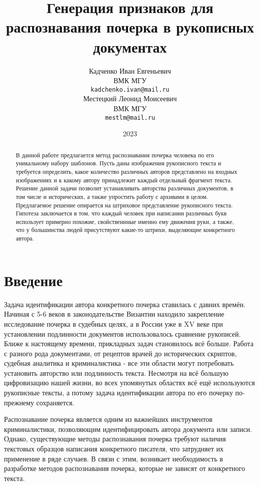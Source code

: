\documentclass{article}
\title{Генерация признаков для распознавания почерка в рукописных документах}
\author{Кадченко Иван Евгеньевич \\
	ВМК МГУ\\
	\texttt{kadchenko.ivan@mail.ru} \\
	\And
	Местецкий Леонид Моисеевич \\
	ВМК МГУ\\
	\texttt{mestlm@mail.ru} \\
}
\date{2023}
\begin{document}
\maketitle

\begin{abstract}
	В данной работе предлагается метод распознавания почерка человека по его уникальному набору шаблонов. Пусть даны изображения рукописного текста и требуется определить, какое количество различных авторов представлено на входных изображениях и к какому автору принадлежит каждый отдельный фрагмент текста. Решение данной задачи позволит устанавливать авторства различных документов, в том числе и исторических, а также упростить работу с архивами в целом. Предлагаемое решение опирается на штриховое представление рукописного текста. Гипотеза заключается в том, что каждый человек при написании различных букв использует примерно похожие, свойственнные именно ему движения руки, а также, что у большинства людей присутствуют какие-то штрихи, выделяющие конкретного автора.
\end{abstract}



\section{Введение}
Задача идентификации автора конкретного почерка ставилась с давних времён. Начиная с 5-6 веков в законодательстве Византии находило закрепление исследование почерка в судебных целях, а в России уже в XV веке при установлении подлинности документов использовалось сравнение рукописей. Ближе к настоящему времени, прикладных задач становилось всё больше. Работа с разного рода документами, от рецептов врачей до исторических скриптов, судебная аналитика и криминалистика - все эти области могут потребовать установить авторство или подлинность текста. Несмотря на всё большую цифровизацию нашей жизни, во всех упомянутых областях всё ещё используются рукописные тексты, а потому задача идентификации автора по его почерку по-прежнему сохраняется.

Распознавание почерка является одним из важнейших инструментов криминалистики, позволяющим идентифицировать автора документа или записи. Однако, существующие методы распознавания почерка требуют наличия текстовых образцов написания конкретного писателя, что затрудняет их применение в ряде случаев. В связи с этим, возникает необходимость в разработке методов распознавания почерка, которые не зависят от конкретного текста.
\end{document}
